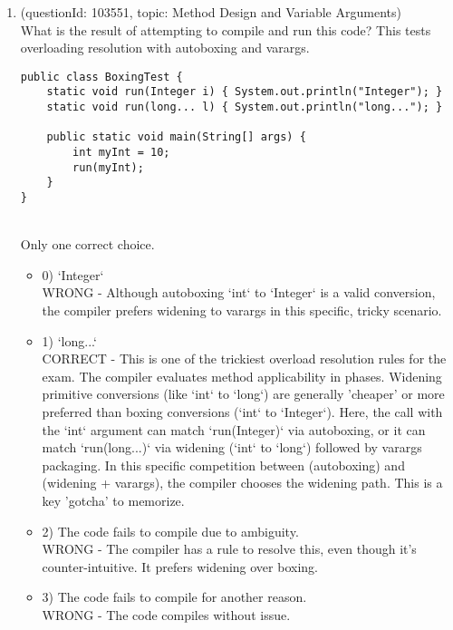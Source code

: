 \documentclass[12pt]{article}
\begin{document}
\begin{enumerate}[label=(\arabic*)]
\begin{itemize}
\end{itemize}
\item (questionId: 103551, topic: Method Design and Variable Arguments) \\ 
What is the result of attempting to compile and run this code? This tests overloading resolution with autoboxing and varargs.
\begin{verbatim}
public class BoxingTest {
    static void run(Integer i) { System.out.println("Integer"); }
    static void run(long... l) { System.out.println("long..."); }

    public static void main(String[] args) {
        int myInt = 10;
        run(myInt);
    }
}
\end{verbatim}
\\ \noindent Only one correct choice. 
\begin{itemize}
\item 0) `Integer`
 \\ 
WRONG - Although autoboxing `int` to `Integer` is a valid conversion, the compiler prefers widening to varargs in this specific, tricky scenario.

\item 1) `long...`
 \\ 
CORRECT - This is one of the trickiest overload resolution rules for the exam. The compiler evaluates method applicability in phases. Widening primitive conversions (like `int` to `long`) are generally 'cheaper' or more preferred than boxing conversions (`int` to `Integer`). Here, the call with the `int` argument can match `run(Integer)` via autoboxing, or it can match `run(long...)` via widening (`int` to `long`) followed by varargs packaging. In this specific competition between (autoboxing) and (widening + varargs), the compiler chooses the widening path. This is a key 'gotcha' to memorize.

\item 2) The code fails to compile due to ambiguity.
 \\ 
WRONG - The compiler has a rule to resolve this, even though it's counter-intuitive. It prefers widening over boxing.

\item 3) The code fails to compile for another reason.
 \\ 
WRONG - The code compiles without issue.


\end{itemize}
\end{enumerate}
\end{document}
